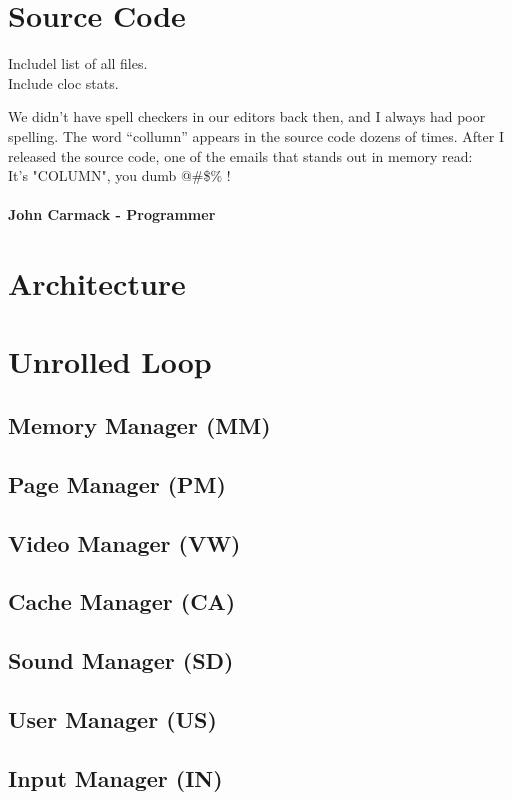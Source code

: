 \documentclass[book.tex]{subfiles}
\begin{document}
\section{Source Code}

Includel list of all files.\\
Include cloc stats.

 \begin{fancyquotes}
   We didn't have spell checkers in our editors back then, and I always had poor spelling.  The word “collumn” appears in the source code dozens of times.  After I released the source code, one of the emails that stands out in memory read:
 \bigskip \\
It's "COLUMN", you dumb @\#\$\% !\\
 \bigskip \\
\textbf{John Carmack - Programmer}
 \end{fancyquotes}



\section{Architecture}
\section{Unrolled Loop}
\subsection{Memory Manager (MM)}
\subsection{Page Manager (PM)}
\subsection{Video Manager (VW)}
\subsection{Cache Manager (CA)}
\subsection{Sound Manager (SD)}
\subsection{User Manager (US)}
\subsection{Input Manager (IN)}
\end{document}
